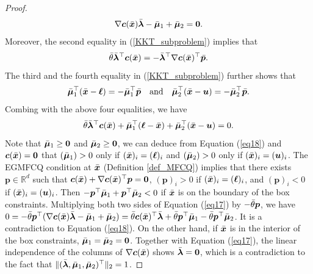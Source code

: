 \documentclass[aos]{imsart}
\numberwithin{equation}{section}
\theoremstyle{plain}
\begin{document}
\begin{appendix}
\begin{proof}
    \begin{equation}
    \label{eq17}
        \nabla \bm{c}(\Bar{\bm{x}}) \Bar{\bm{\lambda}} - \Bar{\bm{\mu}}_{1} + \Bar{\bm{\mu}}_{2} = \bm{0}.
    \end{equation}
    Moreover, the second equality in (\ref{KKT_subproblem}) implies that
    \begin{equation*}
        \Bar{\theta} \Bar{\bm{\lambda}}^{\top} \bm{c}(\Bar{\bm{x}}) =  - \Bar{\bm{\lambda}}^{\top} \nabla \bm{c}(\Bar{\bm{x}})^{\top} \Bar{\bm{p}}.
    \end{equation*}
     The third and the fourth equality in (\ref{KKT_subproblem}) further shows that
     \begin{equation*}
         \Bar{\bm{\mu}}_{1}^{\top} (\Bar{\bm{x}} - \bm{\ell}) = -\Bar{\bm{\mu}}_{1}^{\top} \Bar{\bm{p}} \quad \text{and} \quad \Bar{\bm{\mu}}_{2}^{\top} (\Bar{\bm{x}} - \bm{u}) = -\Bar{\bm{\mu}}_{2}^{\top} \Bar{\bm{p}}.
     \end{equation*}
     Combing with the above four equalities, we have
     \begin{equation}
     \label{eq18}
          \Bar{\theta} \Bar{\bm{\lambda}}^{\top} \bm{c}(\Bar{\bm{x}}) + \Bar{\bm{\mu}}_{1}^{\top} (\bm{\ell} - \Bar{\bm{x}}) + \Bar{\bm{\mu}}_{2}^{\top} (\Bar{\bm{x}} - \bm{u}) = 0.
     \end{equation}
     Note that $\Bar{\bm{\mu}}_{1} \geq \bm{0}$ and $\Bar{\bm{\mu}}_{2} \geq \bm{0}$, we can deduce from Equation (\ref{eq18}) and $\bm{c}(\Bar{\bm{x}}) = \bm{0}$ that $(\Bar{\bm{\mu}}_{1}) > 0$ only if $(\Bar{\bm{x}})_{i} = (\bm{\ell})_i$ and $(\Bar{\bm{\mu}}_{2}) > 0$ only if $(\Bar{\bm{x}})_{i} = (\bm{u})_i$. The EGMFCQ condition at $\Bar{\bm{x}}$ (Definition \ref{def_MFCQ}) implies that there exists $\bm{p} \in \mathbb{R}^{d}$ such that $\bm{c}(\Bar{\bm{x}}) + \nabla \bm{c}(\Bar{\bm{x}})^{\top} \bm{p} = \bm{0}$, $(\bm{p})_{i} > 0$ if $(\Bar{\bm{x}})_{i} = (\bm{\ell})_i$, and $(\bm{p})_{i} < 0$ if $(\Bar{\bm{x}})_{i} = (\bm{u})_i$. Then $- \bm{p}^{\top} \Bar{\bm{\mu}}_{1} + \bm{p}^{\top} \Bar{\bm{\mu}}_{2} < 0$ if $\Bar{\bm{x}}$ is on the boundary of the box constraints. 
     Multiplying both two sides of Equation (\ref{eq17}) by $-\Bar{\theta}\bm{p}$, we have $0 = -\Bar{\theta} \bm{p}^{\top}(\nabla \bm{c}(\Bar{\bm{x}}) \Bar{\bm{\lambda}} - \Bar{\bm{\mu}}_{1} + \Bar{\bm{\mu}}_{2}) = \Bar{\theta}\bm{c}(\Bar{\bm{x}})^{\top} \Bar{\bm{\lambda}} + \Bar{\theta} \bm{p}^{\top} \Bar{\bm{\mu}}_{1} - \Bar{\theta} \bm{p}^{\top} \Bar{\bm{\mu}}_{2}$. It is a contradiction to Equation (\ref{eq18}). On the other hand, if $\Bar{\bm{x}}$ is in the interior of the box constraints, $\Bar{\bm{\mu}}_{1} = \Bar{\bm{\mu}}_{2} = \bm{0}$. Together with Equation (\ref{eq17}), the linear independence of the columns of $\nabla \bm{c}(\Bar{\bm{x}})$ shows $\Bar{\bm{\lambda}} = \bm{0}$, which is a contradiction to the fact that $\|(\Bar{\bm{\lambda}}, \Bar{\bm{\mu}}_{1}, \Bar{\bm{\mu}}_{2})^{\top}\|_2 = 1$.
\end{proof}



\end{appendix}
\end{document}
